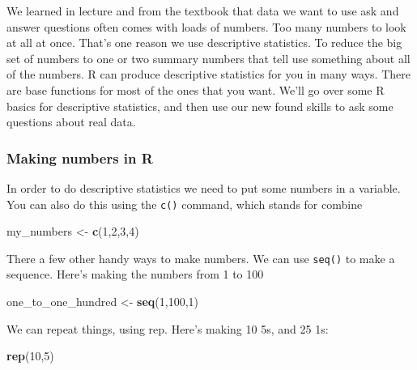 \documentclass[
]{book}
\newenvironment{Shaded}{\begin{snugshade}}{\end{snugshade}}
\newcommand{\DecValTok}[1]{\textcolor[rgb]{0.00,0.00,0.81}{#1}}
\newcommand{\FunctionTok}[1]{\textcolor[rgb]{0.13,0.29,0.53}{\textbf{#1}}}
\newcommand{\NormalTok}[1]{#1}
\newcommand{\OtherTok}[1]{\textcolor[rgb]{0.56,0.35,0.01}{#1}}
\begin{document}
We learned in lecture and from the textbook that data we want to use ask and answer questions often comes with loads of numbers. Too many numbers to look at all at once. That's one reason we use descriptive statistics. To reduce the big set of numbers to one or two summary numbers that tell use something about all of the numbers. R can produce descriptive statistics for you in many ways. There are base functions for most of the ones that you want. We'll go over some R basics for descriptive statistics, and then use our new found skills to ask some questions about real data.

\hypertarget{making-numbers-in-r}{%
\subsubsection{Making numbers in R}\label{making-numbers-in-r}}

In order to do descriptive statistics we need to put some numbers in a variable. You can also do this using the \texttt{c()} command, which stands for combine

\begin{Shaded}
\begin{Highlighting}[]
\NormalTok{my\_numbers }\OtherTok{\textless{}{-}} \FunctionTok{c}\NormalTok{(}\DecValTok{1}\NormalTok{,}\DecValTok{2}\NormalTok{,}\DecValTok{3}\NormalTok{,}\DecValTok{4}\NormalTok{)}
\end{Highlighting}
\end{Shaded}

There a few other handy ways to make numbers. We can use \texttt{seq()} to make a sequence. Here's making the numbers from 1 to 100

\begin{Shaded}
\begin{Highlighting}[]
\NormalTok{one\_to\_one\_hundred }\OtherTok{\textless{}{-}} \FunctionTok{seq}\NormalTok{(}\DecValTok{1}\NormalTok{,}\DecValTok{100}\NormalTok{,}\DecValTok{1}\NormalTok{)}
\end{Highlighting}
\end{Shaded}

We can repeat things, using rep. Here's making 10 5s, and 25 1s:

\begin{Shaded}
\begin{Highlighting}[]
\FunctionTok{rep}\NormalTok{(}\DecValTok{10}\NormalTok{,}\DecValTok{5}\NormalTok{)}
\end{Highlighting}
\end{Shaded}
\end{document}
